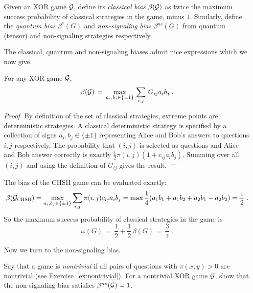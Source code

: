 \begin{definition}
Given an XOR game $\mathcal{G}$, define its \emph{classical bias} $\beta(\mathcal{G})$ as twice the maximum success probability of classical strategies in the game, minus $1$. Similarly, define the \emph{quantum bias} $\beta^*(G)$ and \emph{non-signaling bias} $\beta^{ns}(G)$ from quantum (tensor) and non-signaling strategies respectively.
\end{definition}

The classical, quantum and non-signaling biases admit nice expressions which we now give. 

\begin{lemma}
For any XOR game $\mathcal{G}$, 
 \begin{equation}\label{eq:bias-class}
 \beta(\mathcal{G}) \,=\, \max_{a_i,b_j\in\{\pm 1\}}\,\sum_{i,j}\, G_{ij}a_ib_j \;.
 \end{equation}
\end{lemma}

\begin{proof}
By definition of the set of classical strategies, extreme points are deterministic strategies. A classical deterministic strategy is specified by a collection of signs $a_i,b_j\in\{\pm 1\}$ representing Alice and Bob's answers to questions $i,j$ respectively. The probability that $(i,j)$ is selected as questions and Alice and Bob answer correctly is exactly $\frac{1}{2}\pi(i,j)(1+c_{ij}a_ib_j)$. Summing over all $(i,j)$ and using the definition of $G_{ij}$ gives the result. 
\end{proof}

\begin{example}\label{ex:chsh-beta}
The bias of the CHSH game can be evaluated exactly: 
 $$ \beta(\mathcal{G}_{\textsc{CHSH}})=\max_{a_i,b_j\in\{\pm 1\}}\sum_{i,j}\pi(i,j)c_{ij}a_ib_j=\max\frac{1}{4}(a_1b_1+a_1b_2+a_2b_1-a_2b_2)= \frac{1}{2}\;.  $$
	So the maximum success probability of classical strategies in the game  is
	$$\omega(G) \,=\, \frac{1}{2} + \frac{1}{2}\, \beta(G) \,=\, \frac{3}{4}\;.$$
\end{example}

Now we turn to the non-signaling bias. 

\begin{exercise}
Say that a game is \emph{nontrivial} if all pairs of questions with $\pi(x,y)>0$ are nontrivial (see Exercise~\ref{ex:nontrivial}). For a nontrivial XOR game $\mathcal{G}$, show that the non-signaling bias satisfies $\beta^{ns}(\mathcal{G})=1$.
\end{exercise}

